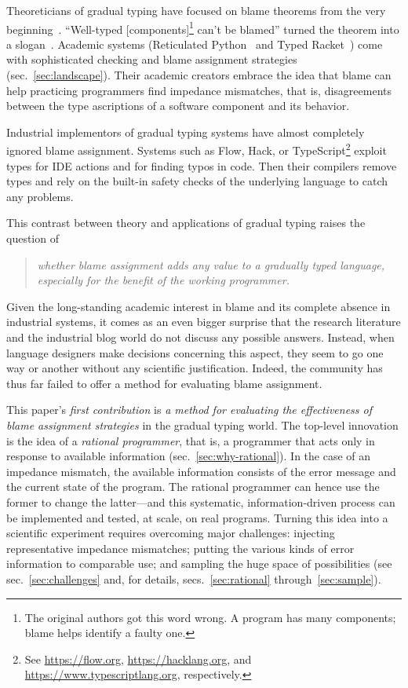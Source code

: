 
Theoreticians of gradual typing have focused on blame theorems from the
very beginning~\citep{mf-toplas-2009, tf-dls-2006}. ``Well-typed
[components]\footnote{The original authors got this word wrong. A program has many components; blame helps identify a faulty one.} can't be
blamed'' turned the theorem into a slogan~\citep{wf-esop-2009}. Academic
systems (Reticulated Python~\citep{vsc-dls-2019, vss-popl-2017,
vksb-dls-2014} and Typed
Racket~\citep{tf-dls-2006,tf-popl-2008,tfffgksst-snapl-2017,tf-icfp-2010})
come with sophisticated checking and blame assignment strategies
(sec.~\ref{sec:landscape}). Their academic creators embrace the idea that
blame can help practicing programmers find impedance mismatches, that is,
disagreements between the type ascriptions of a software component and its
behavior.

Industrial implementors of gradual typing systems have almost
completely ignored blame assignment.  Systems such as Flow, Hack, or
TypeScript\footnote{See \url{https://flow.org},
\url{https://hacklang.org}, and \url{https://www.typescriptlang.org},
respectively.} exploit types for IDE actions and for finding typos in
code. Then their compilers remove types and rely on the built-in
safety checks of the underlying language to catch any problems.

This contrast between theory and applications of gradual typing raises the question of
\begin{quote}
 \it
 whether blame assignment adds any value to a gradually typed language,
 especially for the benefit of the working programmer.
\end{quote}
Given the long-standing academic interest in blame and its complete absence in
industrial systems, it comes as an even bigger surprise that the research
literature and the industrial blog world do not discuss any possible answers.
Instead, when language designers make decisions concerning this aspect, they seem
to go one way or another without any scientific justification. Indeed, the
community has thus far failed to offer a method for evaluating blame assignment.

This paper's {\em first contribution\/} is {\em a method for evaluating the
effectiveness of blame assignment strategies\/} in the gradual typing world.
The top-level innovation is the idea of a {\em rational programmer\/}, that is,
a programmer that acts only in response to available information
(sec.~\ref{sec:why-rational}). In the case of an impedance mismatch, the
available information consists of the error message and the current state of the
program. The rational programmer can hence use the former to change the
latter---and this systematic, information-driven process can be implemented and
tested, at scale, on real programs.  Turning this idea into a scientific
experiment requires overcoming major challenges: injecting representative
impedance mismatches; putting the various kinds of error information to
comparable use; and sampling the huge space of possibilities (see
sec.~\ref{sec:challenges} and, for details, secs.~\ref{sec:rational} through~\ref{sec:sample}).

